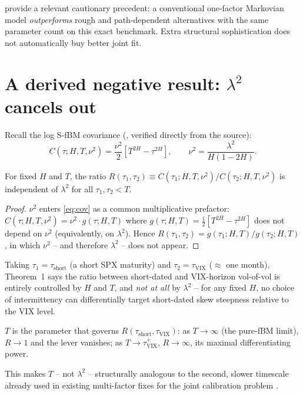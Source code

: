 \documentclass[11pt]{article}
\begin{document}
\citet{abijaberilland2025joint} provide a relevant cautionary precedent: a conventional one-factor Markovian model \emph{outperforms} rough and path-dependent alternatives with the same parameter count on this exact benchmark. Extra structural sophistication does not automatically buy better joint fit.

\section{A derived negative result: $\lambda^2$ cancels out}

Recall the log S-fBM covariance (\citealp{wu2022rough}, verified directly from the source):
\begin{equation}
C(\tau;H,T,\nu^2) = \frac{\nu^2}{2}\left[T^{2H}-\tau^{2H}\right], \qquad \nu^2=\frac{\lambda^2}{H(1-2H)}. \label{eq:cov}
\end{equation}

\begin{theorem}
For fixed $H$ and $T$, the ratio $R(\tau_1,\tau_2) \equiv C(\tau_1;H,T,\nu^2)/C(\tau_2;H,T,\nu^2)$ is independent of $\lambda^2$ for all $\tau_1,\tau_2<T$.
\end{theorem}
\begin{proof}
$\nu^2$ enters \eqref{eq:cov} as a common multiplicative prefactor: $C(\tau;H,T,\nu^2)=\nu^2\cdot g(\tau;H,T)$ where $g(\tau;H,T)=\tfrac12[T^{2H}-\tau^{2H}]$ does not depend on $\nu^2$ (equivalently, on $\lambda^2$). Hence $R(\tau_1,\tau_2)=g(\tau_1;H,T)/g(\tau_2;H,T)$, in which $\nu^2$ -- and therefore $\lambda^2$ -- does not appear.
\end{proof}

Taking $\tau_1=\tau_{\text{short}}$ (a short SPX maturity) and $\tau_2=\tau_{\text{VIX}}$ ($\approx$ one month), Theorem~1 says the ratio between short-dated and VIX-horizon vol-of-vol is entirely controlled by $H$ and $T$, and \emph{not at all} by $\lambda^2$ -- for any fixed $H$, no choice of intermittency can differentially target short-dated skew steepness relative to the VIX level.

\begin{corollary}
$T$ is the parameter that governs $R(\tau_{\text{short}},\tau_{\text{VIX}})$: as $T\to\infty$ (the pure-fBM limit), $R\to1$ and the lever vanishes; as $T\to\tau_{\text{VIX}}^+$, $R\to\infty$, its maximal differentiating power.
\end{corollary}

This makes $T$ -- not $\lambda^2$ -- structurally analogous to the second, slower timescale already used in existing multi-factor fixes for the joint calibration problem \citep{gazzaniguyon2025fourfactor}.
\end{document}
